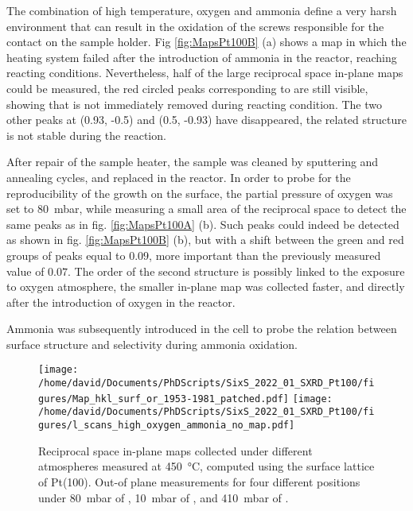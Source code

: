 The combination of high temperature, oxygen and ammonia define a very harsh environment that can result in the oxidation of the screws responsible for the contact on the sample holder.
Fig \ref{fig:MapsPt100B} (a) shows a map in which the heating system failed after the introduction of ammonia in the reactor, reaching reacting conditions.
Nevertheless, half of the large reciprocal space in-plane maps could be measured, the red circled peaks corresponding to  are still visible, showing that  is not immediately removed during reacting condition.
The two other peaks at (0.93, -0.5) and (0.5, -0.93) have disappeared, the related structure is not stable during the reaction.

After repair of the sample heater, the sample was cleaned by sputtering and annealing cycles, and replaced in the reactor.
In order to probe for the reproducibility of the  growth on the surface, the partial pressure of oxygen was set to \qty{80}{\milli\bar}, while measuring a small area of the reciprocal space to detect the same peaks as in fig. \ref{fig:MapsPt100A} (b).
Such peaks could indeed be detected as shown in fig. \ref{fig:MapsPt100B} (b), but with a shift between the green and red groups of peaks equal to $0.09$, more important than the previously measured value of $0.07$.
The order of the second structure is possibly linked to the exposure to oxygen atmosphere, the smaller in-plane map was collected faster, and directly after the introduction of oxygen in the reactor.

Ammonia was subsequently introduced in the cell to probe the relation between surface structure and selectivity during ammonia oxidation.

\begin{figure}[!htb]
    \centering
    \texttt{[image: /home/david/Documents/PhDScripts/SixS\_2022\_01\_SXRD\_Pt100/figures/Map\_hkl\_surf\_or\_1953-1981\_patched.pdf]}
    \texttt{[image: /home/david/Documents/PhDScripts/SixS\_2022\_01\_SXRD\_Pt100/figures/l\_scans\_high\_oxygen\_ammonia\_no\_map.pdf]}
    \caption{
        Reciprocal space in-plane maps collected under different atmospheres measured at \qty{450}{\degreeCelsius}, computed using the surface lattice of Pt(100).
        Out-of plane measurements for four different positions under \qty{80}{\milli\bar} of , \qty{10}{\milli\bar} of , and \qty{410}{\milli\bar} of .
    }
    \label{fig:MapsAndLScansPt100HighOxAmmonia}
\end{figure}

